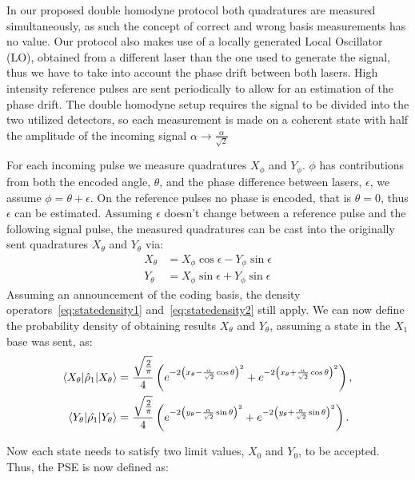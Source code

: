 \documentclass[a4paper]{article}
\begin{document}
In our proposed double homodyne protocol both quadratures are measured simultaneously, as such the concept of correct and wrong basis measurements has no value. Our protocol also makes use of a locally generated Local Oscillator (LO), obtained from a different laser than the one used to generate the signal, thus we have to take into account the phase drift between both lasers. High intensity reference pulses are sent periodically to allow for an estimation of the phase drift. The double homodyne setup requires the signal to be divided into the two utilized detectors, so each measurement is made on a coherent state with half the amplitude of the incoming signal $\alpha\rightarrow\frac{\alpha}{\sqrt{2}}$
\par
For each incoming pulse we measure quadratures $X_\phi$ and $Y_\phi$. $\phi$ has contributions from both the encoded angle, $\theta$, and the phase difference between lasers, $\epsilon$, we assume $\phi=\theta+\epsilon$. On the reference pulses no phase is encoded, that is $\theta=0$, thus $\epsilon$ can be estimated. Assuming $\epsilon$ doesn't change between a reference pulse and the following signal pulse, the measured quadratures can be cast into the originally sent quadratures $X_\theta$ and $Y_\theta$ via:
\begin{equation}
\begin{aligned}
X_\theta&=X_\phi\cos\epsilon-Y_\phi\sin\epsilon\\
Y_\theta&=X_\phi\sin\epsilon+Y_\phi\sin\epsilon
\end{aligned}
\end{equation}
Assuming an announcement of the coding basis, the density operators~\eqref{eq:statedensity1} and~\eqref{eq:statedensity2} still apply. We can now define the probability density of obtaining results $X_\theta$ and $Y_\theta$, assuming a state in the $X_1$ base was sent, as:
\begin{align}
\braket{X_\theta|\hat{\rho}_1|X_\theta}&= \frac{\sqrt{\frac{2}{\pi}}}{4}\left(e^{-2\left(x_\theta-\frac{\alpha}{\sqrt{2}}\cos\theta\right)^2}+e^{-2\left(x_\theta+\frac{\alpha}{\sqrt{2}}\cos\theta\right)^2}\right),\\
\braket{Y_\theta|\hat{\rho_1}|Y_\theta}&= \frac{\sqrt{\frac{2}{\pi}}}{4}\left(e^{-2\left(y_\theta-\frac{\alpha}{\sqrt{2}}\sin\theta\right)^2}+e^{-2\left(y_\theta+\frac{\alpha}{\sqrt{2}}\sin\theta\right)^2}\right).
\end{align}
\par
Now each state needs to satisfy two limit values, $X_0$ and $Y_0$, to be accepted. Thus, the PSE is now defined as:
\end{document}
